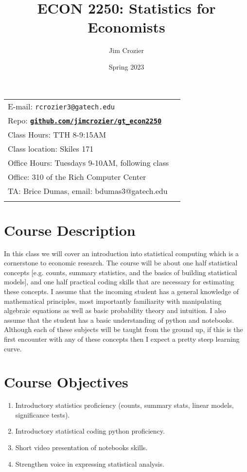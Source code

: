 \documentclass[11pt]{article}
\title{ECON 2250: Statistics for Economists}
\author{Jim Crozier}
\date{Spring 2023}
\newcommand{\blankline}{\quad\pagebreak[2]}
\begin{document}
\maketitle

\blankline

\begin{tabular*}{.93\textwidth}{@{\extracolsep{\fill}}lr}



  E-mail: \texttt{rcrozier3@gatech.edu} \\
  Repo: \href{http://github.com/jimcrozier/gt\_econ2250}{\tt\bf github.com/jimcrozier/gt\_econ2250}  \\


  Class Hours: TTH 8-9:15AM \\
  Class location: 	Skiles 171 \\

Office Hours: Tuesdays 9-10AM, following class \\
Office: 310 of the Rich Computer Center \\
TA: Brice Dumas, email: bdumas3@gatech.edu \\
&  \\
\hline
\end{tabular*}

\vspace{10 mm}

\section*{Course Description}

In this class we will cover an introduction into statistical computing which is a cornerstone to economic research. The course will be about one half statistical concepts [e.g. counts, summary statistics, and the basics of building statistical models], and one half practical coding skills that are necessary for estimating these concepts. I assume that the incoming student has a general knowledge of mathematical principles, most importantly familiarity with manipulating algebraic equations as well as basic probability theory and intuition. I also assume that the student has a basic understanding of python and notebooks. Although each of these subjects will be taught from the ground up, if this is the first encounter with any of these concepts then I expect a pretty steep learning curve. 




\section*{Course Objectives}
\begin{enumerate}
\item Introductory statistics proficiency (counts, summary stats, linear models, significance tests).
\item Introductory statistical coding python proficiency.
\item Short video presentation of notebooks skills.
\item Strengthen voice in expressing statistical analysis. 
\end{enumerate}
\end{document}
